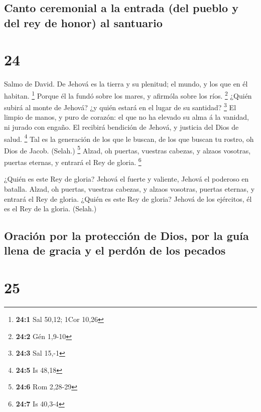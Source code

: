 \hypertarget{canto-ceremonial-a-la-entrada-del-pueblo-y-del-rey-de-honor-al-santuario}{%
\subsection{Canto ceremonial a la entrada (del pueblo y del rey de
honor) al
santuario}\label{canto-ceremonial-a-la-entrada-del-pueblo-y-del-rey-de-honor-al-santuario}}

\hypertarget{section-23}{%
\section{24}\label{section-23}}

 Salmo de David. De Jehová es la tierra y su plenitud; el
mundo, y los que en él habitan. \footnote{\textbf{24:1} Sal 50,12; 1Cor
  10,26}  Porque él la fundó sobre los mares, y afirmóla
sobre los ríos. \footnote{\textbf{24:2} Gén 1,9-10}  ¿Quién
subirá al monte de Jehová? ¿y quién estará en el lugar de su santidad?
\footnote{\textbf{24:3} Sal 15,-1}  El limpio de manos, y
puro de corazón: el que no ha elevado su alma á la vanidad, ni jurado
con engaño.  El recibirá bendición de Jehová, y justicia del
Dios de salud. \footnote{\textbf{24:5} Is 48,18}  Tal es la
generación de los que le buscan, de los que buscan tu rostro, oh Dios de
Jacob. (Selah.) \footnote{\textbf{24:6} Rom 2,28-29}  Alzad,
oh puertas, vuestras cabezas, y alzaos vosotras, puertas eternas, y
entrará el Rey de gloria. \footnote{\textbf{24:7} Is 40,3-4}

 ¿Quién es este Rey de gloria? Jehová el fuerte y valiente,
Jehová el poderoso en batalla.  Alzad, oh puertas, vuestras
cabezas, y alzaos vosotras, puertas eternas, y entrará el Rey de gloria.
 ¿Quién es este Rey de gloria? Jehová de los ejércitos, él
es el Rey de la gloria. (Selah.)

\hypertarget{oraciuxf3n-por-la-protecciuxf3n-de-dios-por-la-guuxeda-llena-de-gracia-y-el-perduxf3n-de-los-pecados}{%
\subsection{Oración por la protección de Dios, por la guía llena de
gracia y el perdón de los
pecados}\label{oraciuxf3n-por-la-protecciuxf3n-de-dios-por-la-guuxeda-llena-de-gracia-y-el-perduxf3n-de-los-pecados}}

\hypertarget{section-24}{%
\section{25}\label{section-24}}

